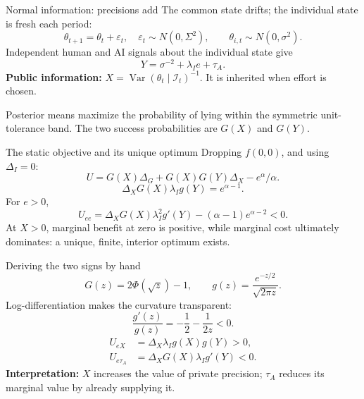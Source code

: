 \documentclass[11pt,aspectratio=169]{beamer}
\begin{document}
\begin{frame}{Normal information: precisions add}
The common state drifts; the individual state is fresh each period:
\[
\theta_{t+1}=\theta_t+\varepsilon_t,\quad\varepsilon_t\sim N(0,\Sigma^2),
\qquad \theta_{i,t}\sim N(0,\sigma^2).
\]
Independent human and AI signals about the individual state give
\[
\boxed{Y=\sigma^{-2}+\lambda_I e+\tau_A.}
\]
\textbf{Public information:} $X=\operatorname{Var}(\theta_t\mid\mathcal I_t)^{-1}$.
It is inherited when effort is chosen.
\medskip

Posterior means maximize the probability of lying within the symmetric
unit-tolerance band. The two success probabilities are $G(X)$ and $G(Y)$.
\end{frame}

\begin{frame}{The static objective and its unique optimum}
Dropping $f(0,0)$, and using $\Delta_I=0$:
\[
U=G(X)\Delta_G+G(X)G(Y)\Delta_X-e^\alpha/\alpha.
\]
\[
\boxed{\Delta_XG(X)\lambda_I g(Y)=e^{\alpha-1}.}
\]
For $e>0$,
\[
U_{ee}=\Delta_XG(X)\lambda_I^2g'(Y)-(\alpha-1)e^{\alpha-2}<0.
\]
At $X>0$, marginal benefit at zero is positive, while marginal cost
ultimately dominates: a unique, finite, interior optimum exists.
\end{frame}

\begin{frame}{Deriving the two signs by hand}
\[
G(z)=2\Phi(\sqrt z)-1,\qquad g(z)=\frac{e^{-z/2}}{\sqrt{2\pi z}}.
\]
Log-differentiation makes the curvature transparent:
\[
\frac{g'(z)}{g(z)}=-\frac12-\frac{1}{2z}<0.
\]
\[
\begin{aligned}
 U_{eX}&=\Delta_X\lambda_I g(X)g(Y)>0,\\[2mm]
 U_{e\tau_A}&=\Delta_XG(X)\lambda_I g'(Y)<0.
\end{aligned}
\]
\textbf{Interpretation:} $X$ increases the value of private precision; $\tau_A$
reduces its marginal value by already supplying it.
\end{frame}
\end{document}
